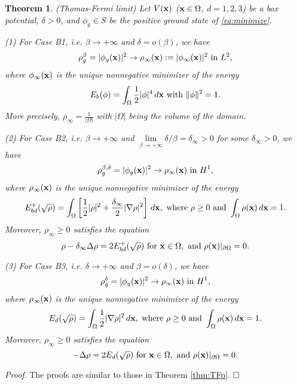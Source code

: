 \documentclass{elsarticle}
\newcommand{\be}{\begin{equation}}
\newcommand{\ee}{\end{equation}}
\newtheorem{theorem}{Theorem}[section]
\newcommand{\bx}{{\bf x} }
\begin{document}
\begin{theorem}\label{thm:tfbd}
(Thomas-Fermi limit) Let $V(\bx)$ ($\bx\in \Omega$, $d=1,2,3$) be a box potential, $\delta>0$, and $\phi_g\in S$ be the positive ground state of \eqref{eq:minimize}.

(1) For Case B1, i.e. $\beta\to +\infty$ and $\delta=o(\beta)$,
we have
\be
\rho_g^{\beta}=|\phi_g(\bx)|^2\to\rho_\infty(\bx):=|\phi_\infty(\bx)|^2 \text{ in } L^2,
\ee
where $\phi_\infty(\bx)$ is the unique nonnegative minimizer of the energy
\be\label{}
E_b(\phi)=\int_{\Omega}\frac{1}{2}|\phi|^4\,d\bx\text{ with }  \|\phi\|^2=1.
\ee
More precisely, $\rho_\infty=\frac{1}{|\Omega|}$ %
with $|\Omega|$ being the volume of the domain.

(2) For Case B2, i.e. $\beta\to +\infty$ and $\lim\limits_{\beta\to+\infty}\delta/\beta=\delta_\infty>0$ for some $\delta_\infty>0$,
we have
\be
\rho_g^{\beta,\delta}=|\phi_g(\bx)|^2\to\rho_\infty(\bx) \text{ in } H^1,
\ee
where $\rho_\infty(\bx)$ is the unique nonnegative minimizer of the energy
\be
E_{bd}^+(\sqrt{\rho})=\int_{\Omega}\left[\frac{1}{2}|\rho|^2+\frac{\delta_\infty}{2}|\nabla\rho|^2\right]\,d\bx,\text{ where } \rho\ge0 \text{ and } \int_{\Omega}\rho(\bx)\,d\bx=1.
\ee
Moreover, $\rho_{\infty}\ge0$ satisfies the equation
\be
\rho-\delta_\infty\Delta\rho=2E_{bd}^+(\sqrt{\rho}) \text{ for } \bx\in\Omega, \text{ and }\rho(\mathbf{x})|_{\partial\Omega}=0.
\ee

(3) For Case B3, i.e. $\delta\to +\infty$ and $\beta=o(\delta)$, we have
\be
\rho_g^{\delta}=|\phi_g(\bx)|^2\to\rho_\infty(\bx) \text{ in } H^1,
\ee
where $\rho_\infty(\bx)$ is the unique nonnegative minimizer of the energy
\be
E_d(\sqrt{\rho})=\int_{\Omega}\frac{1}{2}|\nabla\rho|^2\,d\bx,\text{ where } \rho\ge0\text{ and }\int_{\Omega}\rho(\bx)\,d\bx=1.
\ee
Moreover, $\rho_{\infty}\ge0$ satisfies the equation
\be
-\Delta\rho=2E_d(\sqrt{\rho}) \text{ for } \bx\in\Omega, \text{ and }\rho(\mathbf{x})|_{\partial\Omega}=0.
\ee
\end{theorem}
{\noindent\it Proof}.
The proofs are similar to those in Theorem \ref{thm:TFp}. $\hfill\Box$
\end{document}
